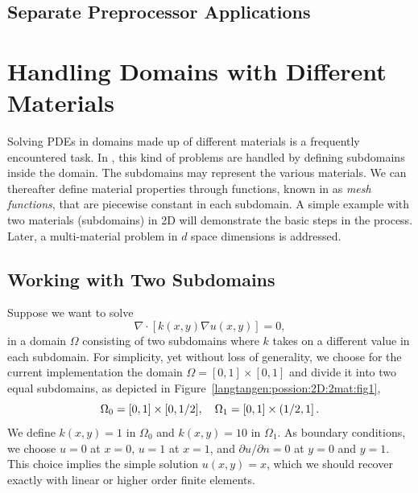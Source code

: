 %


\subsection{Separate Preprocessor Applications}

\section{Handling Domains with Different Materials}

Solving PDEs in domains made up of different materials is a frequently
encountered task. In \fenics, this kind of problems are handled by
defining subdomains inside the domain. The subdomains may represent the
various materials. We can thereafter define material properties through
functions, known in \fenics{} as \emph{mesh functions},
that are piecewise constant in each subdomain.
A simple example with
two materials (subdomains) in 2D will
demonstrate the basic steps in the process. Later, a multi-material
problem in $d$ space dimensions is addressed.

\subsection{Working with Two Subdomains}
\label{langtangen:possion:2D:2mat:problem}


Suppose we want to solve
\begin{equation} \label{langtangen:poisson:2D:2mat:varcoeff2}
    \nabla\cdot \left\lbrack k(x,y)\nabla u(x,y)\right\rbrack = 0,
\end{equation}
in a domain $\Omega$ consisting of two subdomains where $k$ takes on
a different value in each subdomain.
For simplicity, yet without loss of generality, we choose for the current
implementation
the domain $\Omega = [0,1]\times [0,1]$ and divide it into two equal
subdomains, as depicted in Figure~\ref{langtangen:possion:2D:2mat:fig1},
\[ \Omega_0 = [0, 1]\times [0,1/2],\quad
\Omega_1 = [0, 1]\times (1/2,1]\thinspace .\]
We define $k(x,y)=1$ in $\Omega_0$ and $k(x,y)=10$ in $\Omega_1$.
As boundary conditions, we choose $u=0$ at $x=0$, $u=1$ at $x=1$,
and $\partial u/\partial n=0$ at $y=0$ and $y=1$.
This choice implies the simple solution $u(x,y)=x$, which we should
recover exactly with linear or higher order finite elements.

